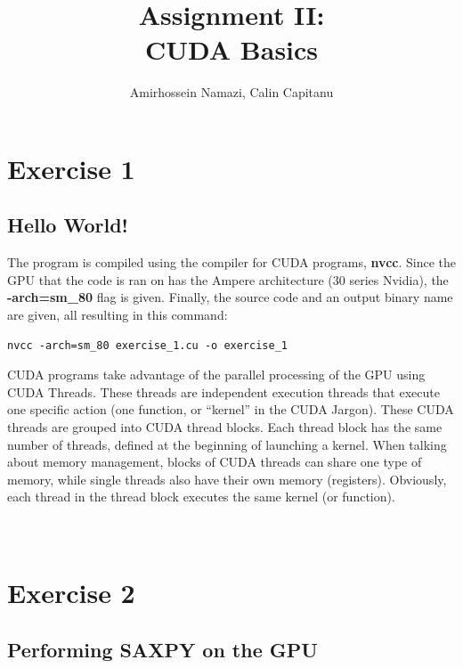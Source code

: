 \documentclass[english]{exam}
\begin{document}
\title{Assignment II:\\ CUDA Basics}
\author{Amirhossein Namazi, Calin Capitanu}

\maketitle


\chapter{Exercise 1}
\section*{Hello World!}

The program is compiled using the compiler for CUDA programs, \textbf{nvcc}. Since the GPU that the code is ran on has the Ampere architecture (30 series Nvidia), the \textbf{-arch=sm\_80} flag is given. Finally, the source code and an output binary name are given, all resulting in this command: \\
\begin{lstlisting}
nvcc -arch=sm_80 exercise_1.cu -o exercise_1
\end{lstlisting}

\noindent

CUDA programs take advantage of the parallel processing of the GPU using CUDA Threads. These threads are independent execution threads that execute one specific action (one function, or ``kernel'' in the CUDA Jargon). These CUDA threads are grouped into CUDA thread blocks. Each thread block has the same number of threads, defined at the beginning of launching a kernel. When talking about memory management, blocks of CUDA threads can share one type of memory, while single threads also have their own memory (registers). Obviously, each thread in the thread block executes the same kernel (or function).\\\\\\

\clearpage
\chapter{Exercise 2}
\section*{Performing SAXPY on the GPU}
\end{document}
